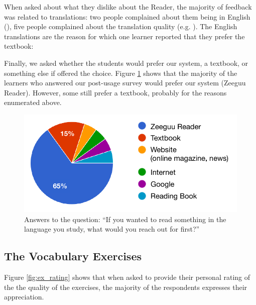 
When asked about what they dislike about the Reader, the majority of feedback was related to translations: two people complained about them being in English (), five people complained about the translation quality (e.g. ). The English translations are the reason for which one learner reported that they prefer the textbook: 


Finally, we asked whether the students would prefer our system, a textbook, or something else if offered the choice.
 Figure \ref{fig:preferred_reader} shows that the majority of the learners who answered our post-usage survey would prefer our system (Zeeguu Reader). However, some still prefer a textbook, probably for the reasons enumerated above.

 \begin{figure}[h!]
    \centering
      \includegraphics[width=0.7\columnwidth]{figures/opinions/reader_vs_textbook}
      \caption{Answers to the question: {``If you wanted to read something in the language you study, what would you reach out for first?''}}
      \label{fig:preferred_reader}
    \end{figure}



\subsection{The Vocabulary Exercises}
Figure \ref{fig:ex_rating} shows that when asked to provide their personal rating of the the quality of the exercises, the majority of the respondents expresses their appreciation. 

